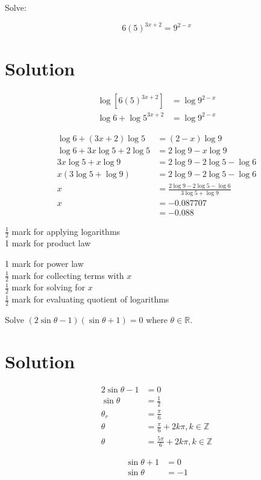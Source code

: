 \documentclass[10pt]{article}
\begin{document}
Solve:

$$
6(5)^{3 x+2}=9^{2-x}
$$

\section*{Solution}
$$
\begin{aligned}
\log \left[6(5)^{3 x+2}\right] & =\log 9^{2-x} \\
\log 6+\log 5^{3 x+2} & =\log 9^{2-x}
\end{aligned}
$$

$$
\begin{aligned}
\log 6+(3 x+2) \log 5 & =(2-x) \log 9 \\
\log 6+3 x \log 5+2 \log 5 & =2 \log 9-x \log 9 \\
3 x \log 5+x \log 9 & =2 \log 9-2 \log 5-\log 6 \\
x(3 \log 5+\log 9) & =2 \log 9-2 \log 5-\log 6 \\
x & =\frac{2 \log 9-2 \log 5-\log 6}{3 \log 5+\log 9} \\
x & =-0.087707 \\
& =-0.088
\end{aligned}
$$

$\frac{1}{2}$ mark for applying logarithms\\
1 mark for product law

1 mark for power law\\
$\frac{1}{2}$ mark for collecting terms with $x$\\
$\frac{1}{2}$ mark for solving for $x$\\
$\frac{1}{2}$ mark for evaluating quotient of logarithms

Solve $(2 \sin \theta-1)(\sin \theta+1)=0$ where $\theta \in \mathbb{R}$.

\section*{Solution}
$$
\begin{aligned}
2 \sin \theta-1 & =0 \\
\sin \theta & =\frac{1}{2} \\
\theta_{r} & =\frac{\pi}{6} \\
\theta & =\frac{\pi}{6}+2 k \pi, k \in \mathbb{Z} \\
\theta & =\frac{5 \pi}{6}+2 k \pi, k \in \mathbb{Z}
\end{aligned}
$$

$$
\begin{aligned}
\sin \theta+1 & =0 \\
\sin \theta & =-1
\end{aligned}
$$
\end{document}
